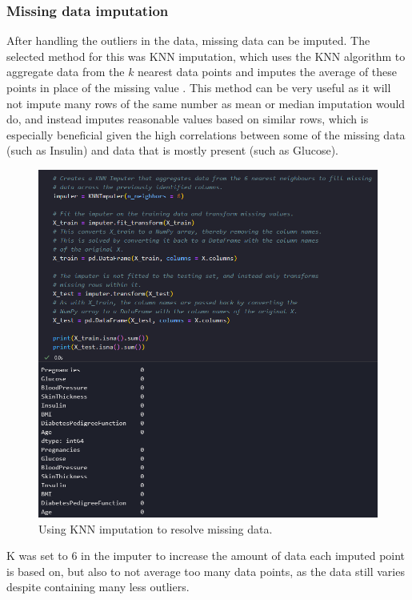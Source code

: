 \documentclass[12pt]{report}
\newcommand{\para}{\vspace{8pt}\noindent}
\begin{document}
\pagebreak 

\subsubsection{Missing data imputation}
After handling the outliers in the data, missing data can be imputed. The selected method for this was KNN imputation,
which uses the KNN algorithm to aggregate data from the $k$ nearest data points and imputes the average of these points 
in place of the missing value \autocite{trainindata_knn_2024}. This method can be very useful as it will not impute many rows 
of the same number as mean or median imputation would do, and instead imputes reasonable values based on similar rows,
which is especially beneficial given the high correlations between some of the missing data (such as Insulin) and data 
that is mostly present (such as Glucose).

\begin{figure}[H]
    \centering
    \includegraphics[width=.8\linewidth]{Preprocessing/KNNImputation.png}
    \caption{Using KNN imputation to resolve missing data.}
    \label{fig:KNNImputation}
\end{figure}

\para K was set to 6 in the imputer to increase the amount of data each imputed point is based on, but also to not average 
too many data points, as the data still varies despite containing many less outliers. 
\end{document}
